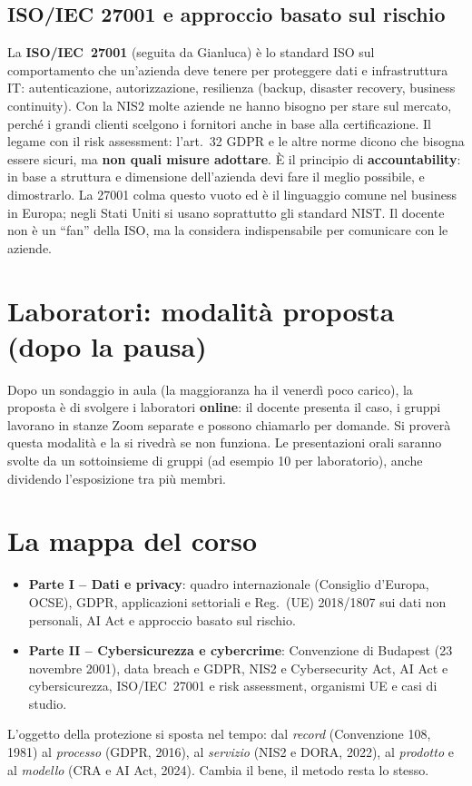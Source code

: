 \subsection{ISO/IEC 27001 e approccio basato sul rischio}
La \textbf{ISO/IEC~27001} (seguita da Gianluca) è lo standard ISO sul comportamento che un'azienda
deve tenere per proteggere dati e infrastruttura IT: autenticazione, autorizzazione, resilienza
(backup, disaster recovery, business continuity). Con la NIS2 molte aziende ne hanno bisogno per
stare sul mercato, perché i grandi clienti scelgono i fornitori anche in base alla certificazione. Il
legame con il risk assessment: l'art.~32 GDPR e le altre norme dicono che bisogna essere sicuri, ma
\textbf{non quali misure adottare}. È il principio di \textbf{accountability}: in base a struttura e
dimensione dell'azienda devi fare il meglio possibile, e dimostrarlo. La 27001 colma questo vuoto ed è
il linguaggio comune nel business in Europa; negli Stati Uniti si usano soprattutto gli standard NIST.
Il docente non è un ``fan'' della ISO, ma la considera indispensabile per comunicare con le aziende.

\section{Laboratori: modalità proposta (dopo la pausa)}
Dopo un sondaggio in aula (la maggioranza ha il venerdì poco carico), la proposta è di svolgere i
laboratori \textbf{online}: il docente presenta il caso, i gruppi lavorano in stanze Zoom separate e
possono chiamarlo per domande. Si proverà questa modalità e la si rivedrà se non funziona. Le
presentazioni orali saranno svolte da un sottoinsieme di gruppi (ad esempio 10 per laboratorio), anche
dividendo l'esposizione tra più membri.

\section{La mappa del corso}
\begin{itemize}
  \item \textbf{Parte I -- Dati e privacy}: quadro internazionale (Consiglio d'Europa, OCSE), GDPR,
    applicazioni settoriali e Reg.~(UE) 2018/1807 sui dati non personali, AI Act e approccio basato sul
    rischio.
  \item \textbf{Parte II -- Cybersicurezza e cybercrime}: Convenzione di Budapest (23 novembre 2001),
    data breach e GDPR, NIS2 e Cybersecurity Act, AI Act e cybersicurezza, ISO/IEC~27001 e risk
    assessment, organismi UE e casi di studio.
\end{itemize}
L'oggetto della protezione si sposta nel tempo: dal \emph{record} (Convenzione 108, 1981) al
\emph{processo} (GDPR, 2016), al \emph{servizio} (NIS2 e DORA, 2022), al \emph{prodotto} e al
\emph{modello} (CRA e AI Act, 2024). Cambia il bene, il metodo resta lo stesso.

